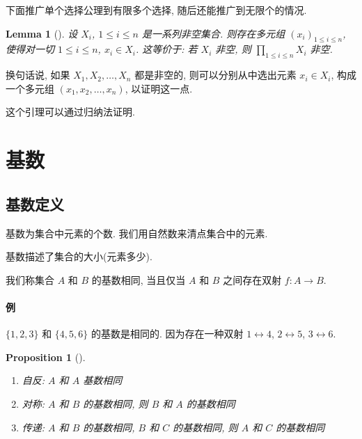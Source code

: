 \documentclass[UTF8]{ctexart}
\theoremstyle{mystyle}
\newtheorem{lemma}{Lemma}[section]
\newtheorem{proposition}{Proposition}[section]
\theoremstyle{myremark}
\theoremstyle{plain}
\newcommand{\set}[1]{\{#1\}}
\begin{document}
下面推广单个选择公理到有限多个选择, 随后还能推广到无限个的情况.
\begin{lemma}[]
    设 $ X_i $, $ 1 \leqslant i \leqslant n $ 是一系列非空集合. 则存在多元组 $ (x_i)_{1 \leqslant i \leqslant n} $, 使得对一切 $ 1 \leqslant i \leqslant n $, $ x_i \in X_i $. 这等价于: 若 $ X_i $ 非空, 则 $ \displaystyle \prod_{1 \leqslant i \leqslant n} X_i $ 非空. 
\end{lemma}

换句话说, 如果 $ X_1, X_2, \dots, X_n $ 都是非空的, 则可以分别从中选出元素 $ x_i \in X_i $, 构成一个多元组 $ (x_1, x_2, \dots, x_n) $, 以证明这一点.

这个引理可以通过归纳法证明. 


\section{基数}
\subsection{基数定义}
\begin{definition}
    基数为集合中元素的个数. 我们用自然数来清点集合中的元素.
\end{definition}

基数描述了集合的大小(元素多少). 

\begin{definition}
    我们称集合 $ A $ 和 $ B $ 的基数相同, 当且仅当 $ A $ 和 $ B $ 之间存在双射 $ f \colon A \to B $.
\end{definition}

\paragraph{例}
$ \set{1, 2, 3} $ 和 $ \set{4, 5, 6} $ 的基数是相同的. 因为存在一种双射 $ 1 \leftrightarrow 4 $, $ 2 \leftrightarrow 5 $, $ 3 \leftrightarrow 6 $.

\begin{proposition}[]
    \ 
    \begin{enumerate}
        \item 自反: $ A $ 和 $ A $ 基数相同
        \item 对称: $ A $ 和 $ B $ 的基数相同, 则 $ B $ 和 $ A $ 的基数相同
        \item 传递: $ A $ 和 $ B $ 的基数相同, $ B $ 和 $ C $ 的基数相同, 则 $ A $ 和 $ C $ 的基数相同
    \end{enumerate}
\end{proposition}
\end{document}
